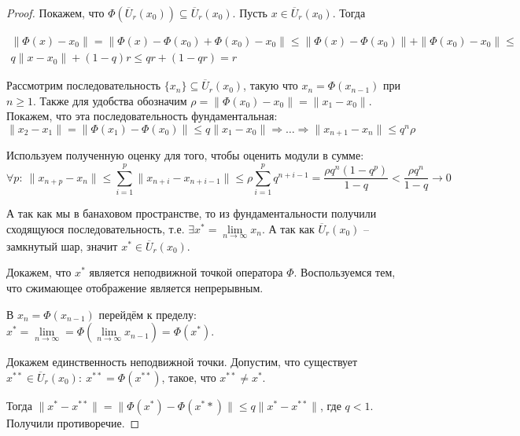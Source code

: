 \documentclass[a4paper,12pt]{article}
\renewcommand{\leq}{\ensuremath{\leqslant}}
\renewcommand{\geq}{\ensuremath{\geqslant}}
\theoremstyle{plain}
\theoremstyle{definition}
\theoremstyle{remark}
\begin{document}
\begin{proof}
	Покажем, что $\Phi(\overline{U}_r(x_0)) \subseteq \overline{U}_r(x_0)$. Пусть $x \in \overline{U}_r(x_0)$. Тогда

	\begin{align*}
		\|\Phi(x) - x_0\| = \|\Phi(x) - \Phi(x_0) + \Phi(x_0) - x_0\| \leq \|\Phi(x) - \Phi(x_0)\| + \|\Phi(x_0) - x_0\| \leq \\
		q\|x - x_0\| + (1 - q)r \leq qr + (1 - qr) = r
	\end{align*}

	Рассмотрим последовательность $\{x_n\} \subseteq \overline{U}_r(x_0)$, такую что $x_n = \Phi(x_{n - 1})$ при $n \geq 1$. Также для удобства обозначим $\rho = \|\Phi(x_0) - x_0\| = \|x_1 - x_0\|$. Покажем, что эта последовательность фундаментальная:
	\[\|x_2 - x_1\| = \|\Phi(x_1) - \Phi(x_0)\| \leq q \|x_1 - x_0\| \Rightarrow \ldots \Rightarrow \|x_{n + 1} - x_n\| \leq q^n\rho\]

	Используем полученную оценку для того, чтобы оценить модули в сумме:
	\[\forall p:\: \|x_{n + p} - x_n\| \leq \sum_{i = 1}^p \|x_{n + i} - x_{n + i - 1}\| \leq \rho \sum_{i = 1}^p q^{n + i - 1} = \frac{\rho q^n(1 - q^p)}{1 - q} < \frac{\rho q^n}{1 - q} \to 0\]

	А так как мы в банаховом пространстве, то из фундаментальности получили сходящуюся последовательность, т.е. $\exists x^* = \lim\limits_{n \to \infty} x_n$. А так как $\overline{U}_r(x_0)$ -- замкнутый шар, значит $x^* \in \overline{U}_r(x_0)$.

	Докажем, что $x^*$ является неподвижной точкой оператора $\Phi$. Воспользуемся тем, что сжимающее отображение является непрерывным.

	В $x_n = \Phi(x_{n - 1})$ перейдём к пределу: $x^* = \lim\limits_{n \to \infty} = \Phi(\lim\limits_{n \to \infty} x_{n - 1}) = \Phi(x^*)$.

	Докажем единственность неподвижной точки. Допустим, что существует $x^{**} \in \overline{U}_r(x_0):\: x^{**} = \Phi(x^{**})$, такое, что $x^{**} \neq x^*$.

	Тогда $\|x^* - x^{**}\| = \|\Phi(x^*) - \Phi(x^**)\| \leq q\|x^* - x^{**}\|$, где $q < 1$. Получили противоречие.
\end{proof}
\end{document}
